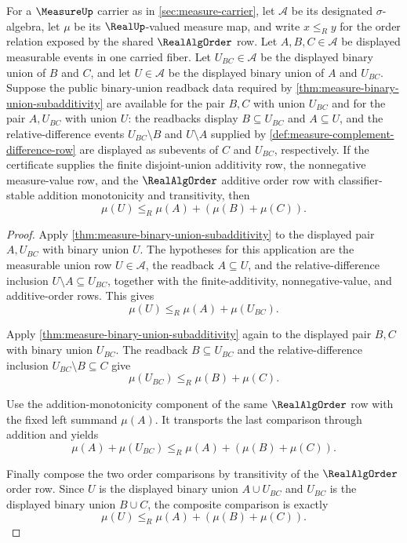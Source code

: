 \begin{theorem}
\label{thm:measure-ternary-union-subadditivity}
For a $\MeasureUp$ carrier as in \autoref{sec:measure-carrier}, let
$\mathcal{A}$ be its designated $\sigma$-algebra, let $\mu$ be its
$\RealUp$-valued measure map, and write $x\le_R y$ for the order relation
exposed by the shared $\RealAlgOrder$ row. Let
$A,B,C\in\mathcal{A}$ be displayed measurable events in one carried fiber.
Let $U_{BC}\in\mathcal{A}$ be the displayed binary union of $B$ and $C$, and
let $U\in\mathcal{A}$ be the displayed binary union of $A$ and $U_{BC}$.
Suppose the public binary-union readback data required by
\autoref{thm:measure-binary-union-subadditivity} are available for the pair
$B,C$ with union $U_{BC}$ and for the pair $A,U_{BC}$ with union $U$: the
readbacks display $B\subseteq U_{BC}$ and $A\subseteq U$, and the
relative-difference events $U_{BC}\setminus B$ and $U\setminus A$ supplied by
\autoref{def:measure-complement-difference-row} are displayed as subevents of
$C$ and $U_{BC}$, respectively. If the certificate supplies the finite
disjoint-union additivity row, the nonnegative measure-value row, and the
$\RealAlgOrder$ additive order row with classifier-stable addition
monotonicity and transitivity, then
$$
\mu(U)\le_R\mu(A)+(\mu(B)+\mu(C)).
$$
\end{theorem}
\begin{proof}
Apply \autoref{thm:measure-binary-union-subadditivity} to the displayed pair
$A,U_{BC}$ with binary union $U$. The hypotheses for this application are the
measurable union row $U\in\mathcal{A}$, the readback $A\subseteq U$, and the
relative-difference inclusion $U\setminus A\subseteq U_{BC}$, together with
the finite-additivity, nonnegative-value, and additive-order rows. This gives
$$
\mu(U)\le_R\mu(A)+\mu(U_{BC}).
$$

Apply \autoref{thm:measure-binary-union-subadditivity} again to the displayed
pair $B,C$ with binary union $U_{BC}$. The readback $B\subseteq U_{BC}$ and the
relative-difference inclusion $U_{BC}\setminus B\subseteq C$ give
$$
\mu(U_{BC})\le_R\mu(B)+\mu(C).
$$

Use the addition-monotonicity component of the same $\RealAlgOrder$ row with
the fixed left summand $\mu(A)$. It transports the last comparison through
addition and yields
$$
\mu(A)+\mu(U_{BC})\le_R\mu(A)+(\mu(B)+\mu(C)).
$$

Finally compose the two order comparisons by transitivity of the
$\RealAlgOrder$ order row. Since $U$ is the displayed binary union
$A\cup U_{BC}$ and $U_{BC}$ is the displayed binary union $B\cup C$, the
composite comparison is exactly
$$
\mu(U)\le_R\mu(A)+(\mu(B)+\mu(C)).
$$
\end{proof}
